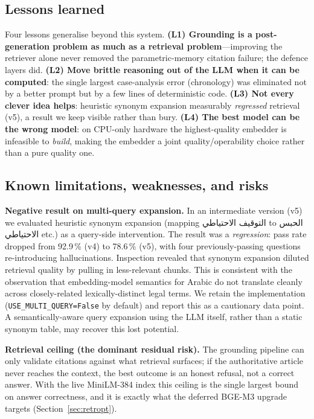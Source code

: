 \documentclass[final,1p,times]{elsarticle}
\newcommand{\ar}[1]{{\arabicfont\beginR #1\endR}}
\begin{document}
\subsection{Lessons learned}

Four lessons generalise beyond this system. \textbf{(L1) Grounding is a
post-generation problem as much as a retrieval problem}---improving the retriever
alone never removed the parametric-memory citation failure; the defence layers
did. \textbf{(L2) Move brittle reasoning out of the LLM when it can be computed}:
the single largest case-analysis error (chronology) was eliminated not by a better
prompt but by a few lines of deterministic code. \textbf{(L3) Not every clever
idea helps}: heuristic synonym expansion measurably \emph{regressed} retrieval
(v5), a result we keep visible rather than bury. \textbf{(L4) The best model can
be the wrong model}: on CPU-only hardware the highest-quality embedder is
infeasible to \emph{build}, making the embedder a joint quality/operability
choice rather than a pure quality one.

\subsection{Known limitations, weaknesses, and risks}\label{sec:weaknesses}

\textbf{Negative result on multi-query expansion.} In an intermediate version
(v5) we evaluated heuristic synonym expansion (mapping
\ar{التوقيف الاحتياطي} to \ar{الحبس الاحتياطي} etc.) as a query-side
intervention. The result was a \emph{regression}: pass rate dropped from
92.9\,\% (v4) to 78.6\,\% (v5), with four previously-passing questions
re-introducing hallucinations. Inspection revealed that synonym expansion
diluted retrieval quality by pulling in less-relevant chunks. This is
consistent with the~\cite{elbeltagy2024} observation that embedding-model
semantics for Arabic do not translate cleanly across closely-related
lexically-distinct legal terms. We retain the implementation
(\texttt{USE\_MULTI\_QUERY=False} by default) and report this as a
cautionary data point. A semantically-aware query expansion using the LLM
itself, rather than a static synonym table, may recover this lost potential.

\textbf{Retrieval ceiling (the dominant residual risk).} The grounding pipeline
can only validate citations against what retrieval surfaces; if the authoritative
article never reaches the context, the best outcome is an honest refusal, not a
correct answer. With the live MiniLM-384 index this ceiling is the single largest
bound on answer correctness, and it is exactly what the deferred BGE-M3 upgrade
targets (Section~\ref{sec:retropt}).
\end{document}
